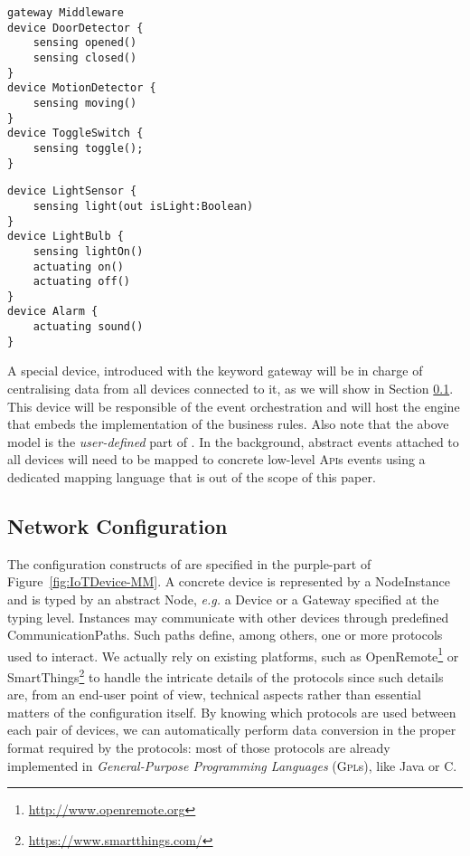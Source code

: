\begin{table}
	\begin{minipage}[b]{.45\textwidth }%
		\begin{lstlisting}[language=iotdsl]	
gateway Middleware
device DoorDetector {
	sensing opened()
	sensing closed()
}
device MotionDetector {
	sensing moving()
}
device ToggleSwitch {
	sensing toggle();
}
		\end{lstlisting}
	\end{minipage}\hfill%
	\begin{minipage}[b]{.45\textwidth}
		\begin{lstlisting}[language=iotdsl, firstnumber=12]
device LightSensor {
	sensing light(out isLight:Boolean)
}
device LightBulb {
	sensing lightOn()
	actuating on()
	actuating off()
}	
device Alarm {
	actuating sound()
}
    \end{lstlisting}
	\end{minipage}
\label{lis:RE-TypeDeclarations}
\end{table}

A special device, introduced with the keyword \textsf{gateway} will be in charge of centralising data from all devices connected to it, as we will show in Section \ref{sec:IoTDSL-NetworkConfiguration}. This device will be responsible of the event orchestration and will host the \CEP engine that embeds the implementation of the business rules. Also note that the above model is the \textit{user-defined} part of \IOTDSL. In the background, abstract events attached to all devices will need to be mapped to concrete low-level \textsc{Api}s events using a dedicated mapping language that is out of the scope of this paper.

\subsection{Network Configuration}
\label{sec:IoTDSL-NetworkConfiguration}

The configuration constructs of \IOTDSL are specified in the purple-part of Figure~\ref{fig:IoTDevice-MM}. A concrete device is represented by a \textsf{NodeInstance} and is typed by an abstract \textsf{Node}, \textit{e.g.} a \textsf{Device} or a \textsf{Gateway} specified at the typing level. Instances may communicate with other \IOT devices through predefined \textsf{CommunicationPath}s. Such paths define, among others, one or more protocols used to interact. We actually rely on existing platforms, such as OpenRemote\footnote{\url{http://www.openremote.org}} or SmartThings\footnote{\url{https://www.smartthings.com/}} to handle the intricate details of the protocols since such details are, from an end-user point of view, technical aspects rather than essential matters of the configuration itself. By knowing which protocols are used between each pair of devices, we can automatically perform data conversion in the proper format required by the protocols: most of those protocols are already implemented in \textit{General-Purpose Programming Languages} (\textsc{Gpl}s), like Java or C.

